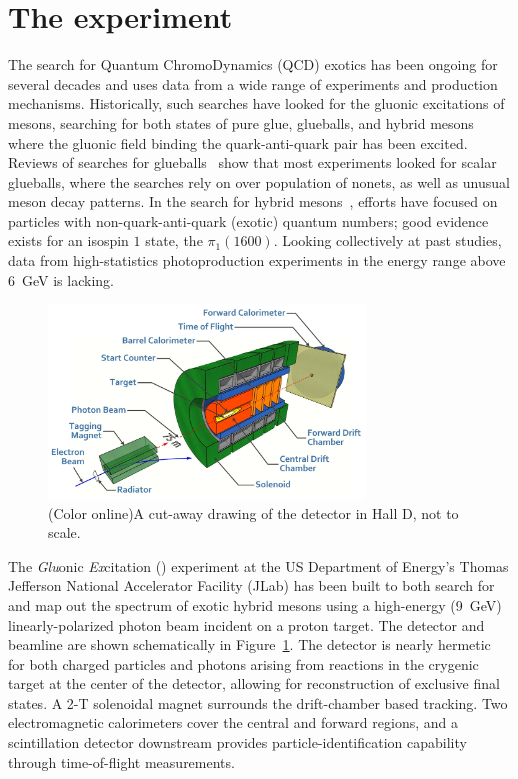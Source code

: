 \section[The \gx{} experiment]{\label{sec:gluexexperiment} The \gx{} experiment}
The search for Quantum ChromoDynamics (QCD) exotics has been ongoing for several decades and uses data from a wide range of experiments and production mechanisms. Historically, such searches have looked for the gluonic excitations of mesons, searching for both states of pure glue, glueballs, and hybrid mesons where the gluonic field binding the quark-anti-quark pair has been excited. Reviews of searches for glueballs~\cite{Crede:2008vw} show that most experiments looked for scalar glueballs, where the searches rely on over population of nonets, as well as unusual meson decay patterns. In the search for hybrid mesons~\cite{Meyer:2010ku,Meyer:2015eta}, efforts have focused on particles with non-quark-anti-quark (exotic) quantum numbers; good evidence exists for an isospin $1$ state, the $\pi_{1}(1600)$. Looking collectively at past studies, data from high-statistics photoproduction experiments in the energy range above $6$~GeV is lacking. 

\begin{figure}[h!]\centering
\includegraphics[width=0.75\textwidth]{figures/GlueX-graphic.jpg}
\caption[]{\label{fig:gluex_cut-away}(Color online)A cut-away drawing of the \GX{} detector in Hall D, not to scale.}
\end{figure}
The \emph{Glu}onic \emph{Ex}citation (\gx{}) experiment at the 
US Department of Energy's Thomas Jefferson National Accelerator Facility (JLab) \cite{jlab-ref} has been built to both search for and map out the spectrum of exotic hybrid mesons using a high-energy (9~GeV) linearly-polarized photon beam incident on a proton target\cite{gluex-ref}. The \gx{} detector and beamline are shown schematically in Figure~\ref{fig:gluex_cut-away}. The detector is nearly hermetic for both charged particles and photons arising from reactions in the crygenic target at the center of the detector, allowing for reconstruction of exclusive final states. A 2-T solenoidal magnet surrounds the drift-chamber based tracking. Two electromagnetic calorimeters cover the central and forward regions, and a scintillation detector downstream provides particle-identification capability through time-of-flight measurements. 


